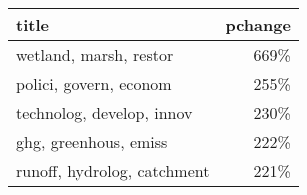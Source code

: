 \begin{tabular}{p{1.2cm}r}
\toprule
                       title &  pchange \\
\midrule
      wetland, marsh, restor &     669\% \\
      polici, govern, econom &     255\% \\
   technolog, develop, innov &     230\% \\
       ghg, greenhous, emiss &     222\% \\
 runoff, hydrolog, catchment &     221\% \\
\bottomrule
\end{tabular}
